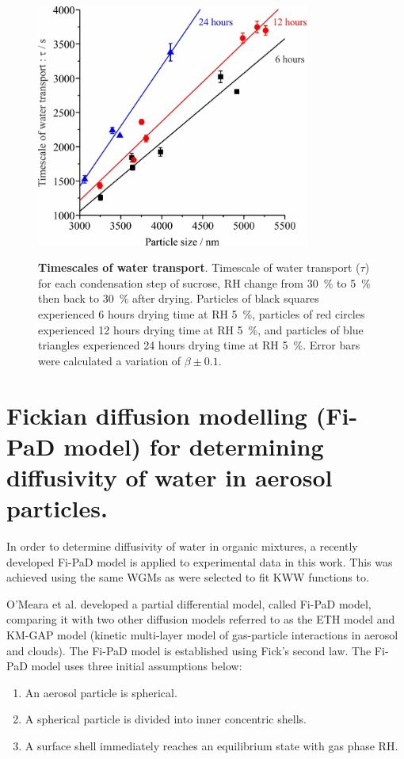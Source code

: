 \begin{figure}
    \centering
    \caption{\textbf{Timescales of water transport}. Timescale of water transport ($\tau$) for each condensation step of sucrose, RH change from \SI{30}{\percent} to \SI{5}{\percent} then back to \SI{30}{\percent} after drying. Particles of black squares experienced \num{6} hours drying time at RH \SI{5}{\percent}, particles of red circles experienced \num{12} hours drying time at RH \SI{5}{\percent}, and particles of blue triangles experienced \num{24} hours drying time at RH \SI{5}{\percent}. Error bars were calculated a variation of $\beta \pm \num{0.1}$. }
    \includegraphics[width=0.8\textwidth]{chapters/water_hopping/figures/image006.jpg}
    \label{fig:wat_s4}
\end{figure}

\section{Fickian diffusion modelling (Fi-PaD model) for determining diffusivity of water in aerosol particles.}

In order to determine diffusivity of water in organic mixtures, a recently developed Fi-PaD model is applied to experimental data in this work. This was achieved using the same WGMs as were selected to fit KWW functions to.

O’Meara et al. developed a partial differential model, called Fi-PaD model, comparing it with two other diffusion models referred to as the ETH model and KM-GAP model (kinetic multi-layer model of gas-particle interactions in aerosol and clouds).\cite{omearaRateEquilibrationViscous2016} The Fi-PaD model is established using Fick’s second law. The Fi-PaD model uses three initial assumptions below:
\begin{enumerate}
    \item An aerosol particle is spherical.
    \item A spherical particle is divided into inner concentric shells.
    \item A surface shell immediately reaches an equilibrium state with gas phase RH.
\end{enumerate}

